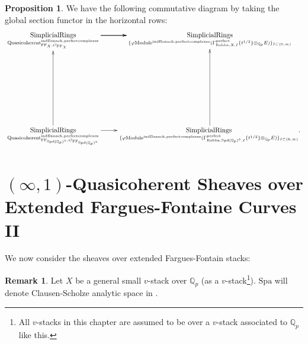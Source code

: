 \documentclass[12pt]{book}
\theoremstyle{definition}
\newtheorem{proposition}{Proposition}
\newtheorem{remark}{Remark}
\begin{document}
\begin{proposition}
We have the following commutative diagram by taking the global section functor in the horizontal rows:\\
\[\displayindent=+0in
\xymatrix@C+0in@R+7pc{
\underset{\mathrm{Quasicoherent}^{\mathrm{indBanach,perfectcomplexes}}_{\mathrm{FF}_X,\mathcal{O}_{\mathrm{FF}_X}}}{\mathrm{SimplicialRings}}  \ar[r] \ar[r] \ar[r] &\underset{\{\varphi\mathrm{Module}^{\mathrm{indBanach,perfectcomplexes}}(\Gamma^\text{perfect}_{\text{Robba},X,I}\{t^{1/2}\}\otimes_{\mathbb{Q}_p}E)\}_{I\subset (0,\infty)}}{\mathrm{SimplicialRings}}   \\
\underset{\mathrm{Quasicoherent}^{\mathrm{indBanach,perfectcomplexes}}_{\mathrm{FF}_{\mathrm{Spd}(\mathbb{Q}_p)^\diamond},\mathcal{O}_{\mathrm{FF}_{\mathrm{Spd}(\mathbb{Q}_p)^\diamond}}}}{\mathrm{SimplicialRings}} \ar[u]\ar[r] &\underset{\{\varphi\mathrm{Module}^{\mathrm{indBanach,perfectcomplexes}}(\Gamma^\text{perfect}_{\text{Robba},{\mathrm{Spd}(\mathbb{Q}_p)^\diamond},I}\{t^{1/2}\}\otimes_{\mathbb{Q}_p}E)\}_{I\subset (0,\infty)}}{\mathrm{SimplicialRings}}.\ar[u]  
}
\]

\end{proposition}





\newpage
\section{$(\infty,1)$-Quasicoherent Sheaves over Extended Fargues-Fontaine Curves II}

\noindent We now consider the sheaves over extended Fargues-Fontain stacks:

\begin{remark}
Let $X$ be a general small $v$-stack over $\mathbb{Q}_p$ (as a $v$-stack\footnote{All $v$-stacks in this chapter are assumed to be over a $v$-stack associated to $\mathbb{Q}_p$ like this.}). $\mathrm{Spa}$ will denote Clausen-Scholze analytic space in \cite{CS2}. 
\end{remark}
\end{document}

